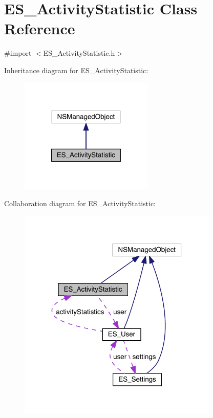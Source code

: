 \hypertarget{interface_e_s___activity_statistic}{\section{E\+S\+\_\+\+Activity\+Statistic Class Reference}
\label{interface_e_s___activity_statistic}
}


{\ttfamily \#import $<$E\+S\+\_\+\+Activity\+Statistic.\+h$>$}



Inheritance diagram for E\+S\+\_\+\+Activity\+Statistic\+:\nopagebreak
\begin{figure}[H]
\begin{center}
\leavevmode
\includegraphics[width=180pt]{de/d85/interface_e_s___activity_statistic__inherit__graph}
\end{center}
\end{figure}


Collaboration diagram for E\+S\+\_\+\+Activity\+Statistic\+:\nopagebreak
\begin{figure}[H]
\begin{center}
\leavevmode
\includegraphics[width=270pt]{d1/d82/interface_e_s___activity_statistic__coll__graph}
\end{center}
\end{figure}
